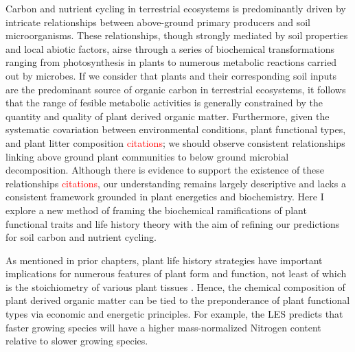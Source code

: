 Carbon and nutrient cycling in terrestrial ecosystems is predominantly driven by intricate relationships between above-ground primary producers and soil microorganisms. These relationships, though strongly mediated by soil properties and local abiotic factors, airse through a series of biochemical transformations ranging from photosynthesis in plants to numerous metabolic reactions carried out by microbes. If we consider that plants and their corresponding soil inputs are the predominant source of organic carbon in terrestrial ecosystems, it follows that the range of fesible metabolic activities is generally constrained by the quantity and quality of plant derived organic matter. Furthermore, given the systematic covariation between environmental conditions, plant functional types, and plant litter composition \textcolor{red}{citations}; we should observe consistent relationships linking above ground plant communities to below ground microbial decomposition. Although there is evidence to support the existence of these relationships \textcolor{red}{citations}, our understanding remains largely descriptive and lacks a consistent framework grounded in plant energetics and biochemistry. Here I explore a new method of framing the biochemical ramifications of plant functional traits and life history theory with the aim of refining our predictions for soil carbon and nutrient cycling. 


As mentioned in prior chapters, plant life history strategies have important implications for numerous features of plant form and function, not least of which is the stoichiometry of various plant tissues \cite{reich2014a}. Hence, the chemical composition of plant derived organic matter can be tied to the preponderance of plant functional types via economic and energetic principles. For example, the LES predicts that faster growing species will have a higher mass-normalized Nitrogen content relative to slower growing species.



